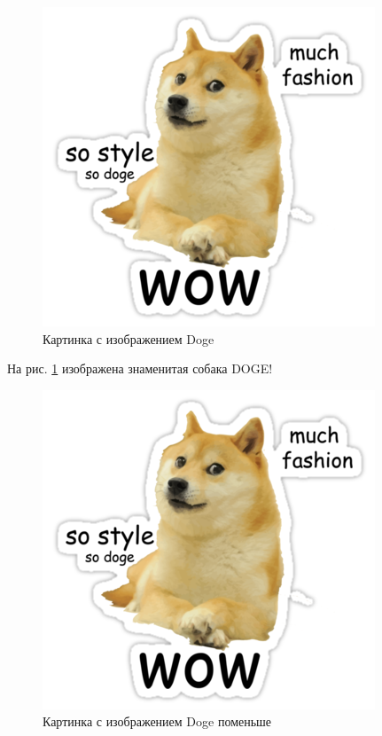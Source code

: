 \documentclass[12pt, a4paper]{article}  %
\begin{document}
\begin{figure}[t]
	\begin{center}
		\includegraphics[width=0.2\textheight]{doge.png}
	\end{center}
	\caption{Картинка с изображением Doge}\label{pic:doge}
\end{figure}

На рис. \ref{pic:doge} изображена знаменитая собака DOGE!


\begin{figure}
	\caption{Картинка с изображением Doge поменьше}
	\begin{center}
		\includegraphics[width=0.1\textheight]{doge.png}
	\end{center}
\end{figure}
\end{document}
